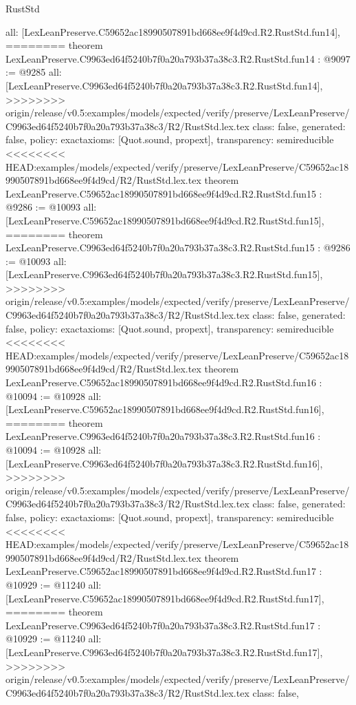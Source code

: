 \begin{lexlean}{RustStd}
\begin{coremodule}
{\begin{coremodule}
{{{{{{{{{{{{{{{{{  all: [LexLeanPreserve.C59652ac18990507891bd668ee9f4d9cd.R2.RustStd.fun14],
========
theorem LexLeanPreserve.C9963ed64f5240b7f0a20a793b37a38c3.R2.RustStd.fun14 : @9097 := @9285 {
  all: [LexLeanPreserve.C9963ed64f5240b7f0a20a793b37a38c3.R2.RustStd.fun14],
>>>>>>>> origin/release/v0.5:examples/models/expected/verify/preserve/LexLeanPreserve/C9963ed64f5240b7f0a20a793b37a38c3/R2/RustStd.lex.tex
  class: false,
  generated: false,
  policy: exact{axioms: [Quot.sound, propext]},
  transparency: semireducible
}
<<<<<<<< HEAD:examples/models/expected/verify/preserve/LexLeanPreserve/C59652ac18990507891bd668ee9f4d9cd/R2/RustStd.lex.tex
theorem LexLeanPreserve.C59652ac18990507891bd668ee9f4d9cd.R2.RustStd.fun15 : @9286 := @10093 {
  all: [LexLeanPreserve.C59652ac18990507891bd668ee9f4d9cd.R2.RustStd.fun15],
========
theorem LexLeanPreserve.C9963ed64f5240b7f0a20a793b37a38c3.R2.RustStd.fun15 : @9286 := @10093 {
  all: [LexLeanPreserve.C9963ed64f5240b7f0a20a793b37a38c3.R2.RustStd.fun15],
>>>>>>>> origin/release/v0.5:examples/models/expected/verify/preserve/LexLeanPreserve/C9963ed64f5240b7f0a20a793b37a38c3/R2/RustStd.lex.tex
  class: false,
  generated: false,
  policy: exact{axioms: [Quot.sound, propext]},
  transparency: semireducible
}
<<<<<<<< HEAD:examples/models/expected/verify/preserve/LexLeanPreserve/C59652ac18990507891bd668ee9f4d9cd/R2/RustStd.lex.tex
theorem LexLeanPreserve.C59652ac18990507891bd668ee9f4d9cd.R2.RustStd.fun16 : @10094 := @10928 {
  all: [LexLeanPreserve.C59652ac18990507891bd668ee9f4d9cd.R2.RustStd.fun16],
========
theorem LexLeanPreserve.C9963ed64f5240b7f0a20a793b37a38c3.R2.RustStd.fun16 : @10094 := @10928 {
  all: [LexLeanPreserve.C9963ed64f5240b7f0a20a793b37a38c3.R2.RustStd.fun16],
>>>>>>>> origin/release/v0.5:examples/models/expected/verify/preserve/LexLeanPreserve/C9963ed64f5240b7f0a20a793b37a38c3/R2/RustStd.lex.tex
  class: false,
  generated: false,
  policy: exact{axioms: [Quot.sound, propext]},
  transparency: semireducible
}
<<<<<<<< HEAD:examples/models/expected/verify/preserve/LexLeanPreserve/C59652ac18990507891bd668ee9f4d9cd/R2/RustStd.lex.tex
theorem LexLeanPreserve.C59652ac18990507891bd668ee9f4d9cd.R2.RustStd.fun17 : @10929 := @11240 {
  all: [LexLeanPreserve.C59652ac18990507891bd668ee9f4d9cd.R2.RustStd.fun17],
========
theorem LexLeanPreserve.C9963ed64f5240b7f0a20a793b37a38c3.R2.RustStd.fun17 : @10929 := @11240 {
  all: [LexLeanPreserve.C9963ed64f5240b7f0a20a793b37a38c3.R2.RustStd.fun17],
>>>>>>>> origin/release/v0.5:examples/models/expected/verify/preserve/LexLeanPreserve/C9963ed64f5240b7f0a20a793b37a38c3/R2/RustStd.lex.tex
  class: false,
}}}}}}}}}}}}}}}}}}}}}
\end{coremodule}}
\end{coremodule}
\end{lexlean}

